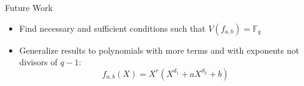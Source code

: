 \documentclass{beamer}
\newtheorem{proposition}{Proposition}
\begin{document}


    




\begin{frame}{Future Work}
  \begin{itemize}
    \item Find necessary and sufficient conditions such that $V(f_{a,b}) = \mathbb{F}_q$
    \vspace{0.8cm}
    \item Generalize results to polynomials with more terms and with exponents not divisors of $q-1$: $$f_{a,b}(X) = X^r(X^{d_1} + aX^{d_2} +b)$$
  \end{itemize}
\end{frame}

\end{document}
